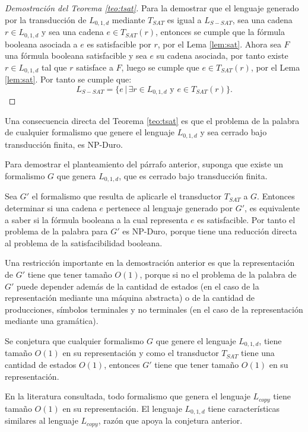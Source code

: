 \documentclass[12pt]{article}
\begin{document}
\begin{proof}[Demostración del Teorema \ref{teo:tsat}]
    Para la demostrar que el lenguaje generado por la transducción de $L_{0,1,d}$ mediante $T_{SAT}$ es igual a $L_{S-SAT}$, sea una cadena $r \in L_{0,1,d}$ y sea una cadena $e\in T_{SAT}(r)$, entonces 
    se cumple que la fórmula booleana asociada a $e$ es satisfacible por $r$, por el Lema \ref{lem:sat}. Ahora sea $F$ una fórmula 
    booleana satisfacible y sea $e$ su cadena asociada, por tanto existe $r\in L_{0,1,d}$ tal que $r$ satisface a $F$, luego se cumple que $e\in T_{SAT}(r)$, por el Lema \ref{lem:sat}. Por tanto se cumple que:
    $$L_{S-SAT} = \{e\,|\,\exists r \in L_{0,1,d} \text{ y } e \in T_{SAT}(r) \}.$$
    
\end{proof}

Una consecuencia directa del Teorema \ref{teo:tsat} es que el problema de la palabra de cualquier formalismo que genere el lenguaje $L_{0,1,d}$ y sea cerrado bajo transducción finita, es NP-Duro.

Para demostrar el planteamiento del párrafo anterior, suponga que existe un formalismo $G$ que genera $L_{0,1,d}$,
que es cerrado bajo transducción finita. 

Sea $G'$ el formalismo que resulta de aplicarle el transductor $T_{SAT}$ a $G$. Entonces determinar si una cadena
$e$ pertenece al lenguaje generado por $G'$, es equivalente a saber si la fórmula booleana a la cual representa
$e$ es satisfacible. Por tanto el problema de la palabra para
$G'$ es NP-Duro, porque tiene una reducción directa al problema de la satisfacibilidad booleana.

Una restricción importante en la demostración anterior es que la representación de $G'$ tiene que tener tamaño $O(1)$,
porque si no el problema de la palabra de $G'$ puede depender además de la cantidad de estados (en el caso de
la representación mediante una máquina abstracta) o de la cantidad de producciones, símbolos terminales y no terminales
(en el caso de la representación mediante una  gramática).

Se conjetura que cualquier formalismo $G$ que genere el lenguaje $L_{0,1,d}$, tiene tamaño $O(1)$ en su representación y como el transductor $T_{SAT}$ tiene una cantidad de estados $O(1)$, entonces $G'$ tiene que tener tamaño $O(1)$ en su representación.

En la literatura consultada, todo formalismo que genera el lenguaje $L_{copy}$ tiene tamaño $O(1)$ en su
representación. El lenguaje $L_{0,1,d}$ tiene características similares al  lenguaje $L_{copy}$,
razón que apoya la conjetura anterior.
\end{document}
